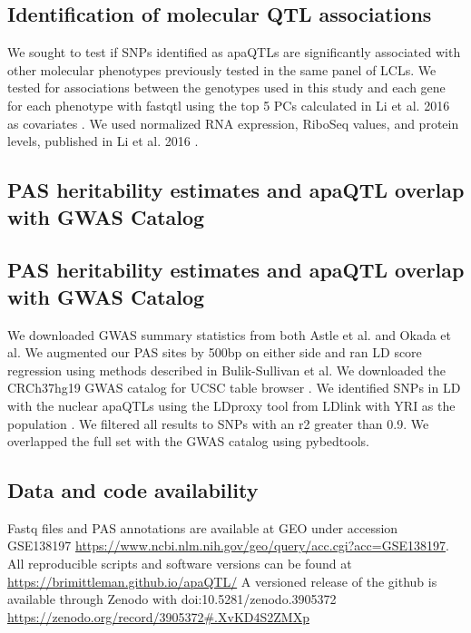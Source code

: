 \subsection{Identification of molecular QTL associations}\label{Identification-molecular-QTL-associations}
We sought to test if SNPs identified as apaQTLs are significantly associated with other molecular phenotypes previously tested in the same panel of LCLs. We tested for associations between the genotypes used in this study and each gene for each phenotype with fastqtl using the top 5 PCs calculated in Li et al. 2016 as covariates \citep{li_rna_2016}. We used normalized RNA expression, RiboSeq values, and protein levels, published in Li et al. 2016 \citep{li_rna_2016}. 


\subsection{PAS heritability estimates and apaQTL overlap with GWAS Catalog}\label{PAS-heritability-estimates-GWAS-Catalog}
\subsection*{PAS heritability estimates and apaQTL overlap with GWAS Catalog}
We downloaded GWAS summary statistics from both Astle et al. and Okada et al. \citep{astle_allelic_2016, okada_genetics_2014} We augmented our PAS sites by 500bp on either side and ran LD score regression using methods described in Bulik-Sullivan et al. \citep{bulik-sullivan_ld_2015} We downloaded the CRCh37hg19 GWAS catalog for UCSC table browser \citep{kent_human_2002}. We identified SNPs in LD with the nuclear apaQTLs using the LDproxy tool from LDlink with YRI as the population \citep{machiela_ldlink_2015}. We filtered all results to SNPs with an r2 greater than 0.9. We overlapped the full set with the GWAS catalog using pybedtools. 



\subsection{Data and code
availability}\label{ch02-data-and-code-availability}

Fastq files and PAS annotations are available at GEO under accession GSE138197 \url{https://www.ncbi.nlm.nih.gov/geo/query/acc.cgi?acc=GSE138197}. All reproducible scripts and software versions can be found at \url{https://brimittleman.github.io/apaQTL/} A versioned release of the github is available through Zenodo with doi:10.5281/zenodo.3905372 \url{https://zenodo.org/record/3905372#.XvKD4S2ZMXp}


